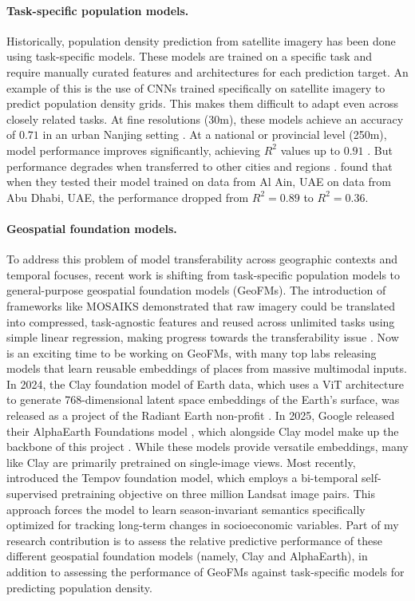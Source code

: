 \documentclass[12pt,letterpaper]{article}
\begin{document}
\paragraph{Task-specific population models.} Historically, population density prediction from satellite imagery has been done using task-specific models. These models are trained on a specific task and require manually curated features and architectures for each prediction target. An example of this is the use of CNNs trained specifically on satellite imagery to predict population density grids. This makes them difficult to adapt even across closely related tasks. At fine resolutions (30m), these models achieve an accuracy of $0.71$ in an urban Nanjing setting \parencite{SONG2019103580}. At a national or provincial level (250m), model performance improves significantly, achieving $R^2$ values up to $0.91$ \parencite{rs11222620}. But performance degrades when transferred to other cities and regions \parencite{tenzer_geospatial_2023}. \textcite{YAGOUB2024101122} found that when they tested their model trained on data from Al Ain, UAE on data from Abu Dhabi, UAE, the performance dropped from $R^2 = 0.89$ to $R^2 = 0.36$.

\paragraph{Geospatial foundation models.} To address this problem of model transferability across geographic contexts and temporal focuses, recent work is shifting from task-specific population models to general-purpose geospatial foundation models (GeoFMs). The introduction of frameworks like MOSAIKS demonstrated that raw imagery could be translated into compressed, task-agnostic features and reused across unlimited tasks using simple linear regression, making progress towards the transferability issue \parencite{sherman2026global}. Now is an exciting time to be working on GeoFMs, with many top labs releasing models that learn reusable embeddings of places from massive multimodal inputs. In 2024, the Clay foundation model of Earth data, which uses a ViT architecture to generate 768-dimensional latent space embeddings of the Earth's surface, was released as a project of the Radiant Earth non-profit \parencite{clayfoundation2026}. In 2025, Google released their AlphaEarth Foundations model \parencite{Brownetal2025}, which alongside Clay model make up the backbone of this project \parencite{proctor2025what}. While these models provide versatile embeddings, many like Clay are primarily pretrained on single-image views. Most recently, \textcite{zheng2026satellite} introduced the Tempov foundation model, which employs a bi-temporal self-supervised pretraining objective on three million Landsat image pairs. This approach forces the model to learn season-invariant semantics specifically optimized for tracking long-term changes in socioeconomic variables. Part of my research contribution is to assess the relative predictive performance of these different geospatial foundation models (namely, Clay and AlphaEarth), in addition to assessing the performance of GeoFMs against task-specific models for predicting population density. 
\end{document}
